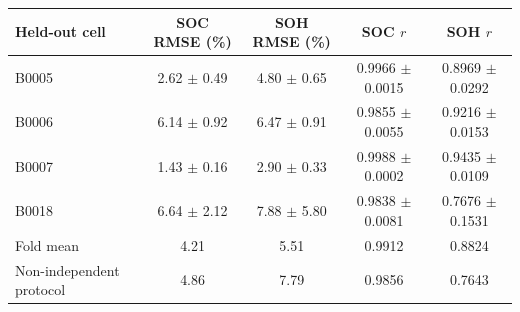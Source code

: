 \begin{tabular}{lcccc}
\toprule
Held-out cell & SOC RMSE (\%) & SOH RMSE (\%) & SOC $r$ & SOH $r$ \\
\midrule
B0005 & 2.62 $\pm$ 0.49 & 4.80 $\pm$ 0.65 & 0.9966 $\pm$ 0.0015 & 0.8969 $\pm$ 0.0292 \\
B0006 & 6.14 $\pm$ 0.92 & 6.47 $\pm$ 0.91 & 0.9855 $\pm$ 0.0055 & 0.9216 $\pm$ 0.0153 \\
B0007 & 1.43 $\pm$ 0.16 & 2.90 $\pm$ 0.33 & 0.9988 $\pm$ 0.0002 & 0.9435 $\pm$ 0.0109 \\
B0018 & 6.64 $\pm$ 2.12 & 7.88 $\pm$ 5.80 & 0.9838 $\pm$ 0.0081 & 0.7676 $\pm$ 0.1531 \\
\midrule
Fold mean & 4.21 & 5.51 & 0.9912 & 0.8824 \\
Non-independent protocol & 4.86 & 7.79 & 0.9856 & 0.7643 \\
\bottomrule
\end{tabular}
